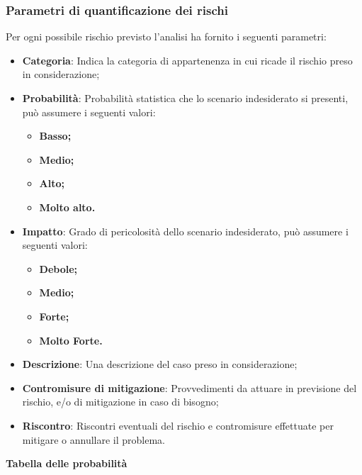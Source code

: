 \documentclass{scalatekids-article}
\begin{document}
\subsubsection{Parametri di quantificazione dei rischi}
Per ogni possibile rischio previsto l'analisi ha fornito i seguenti parametri:
\begin{itemize}
\item\textbf{Categoria}: Indica la categoria di appartenenza in cui ricade il
  rischio preso in considerazione;
\item\textbf{Probabilità}: Probabilità statistica che lo scenario indesiderato
  si presenti, può assumere i seguenti valori:
  \begin{itemize}
  \item\textbf{Basso;}
  \item\textbf{Medio;}
  \item\textbf{Alto;}
  \item\textbf{Molto alto.}
  \end{itemize}
\item\textbf{Impatto}: Grado di pericolosità dello scenario indesiderato, può
  assumere i seguenti valori:
  \begin{itemize}
  \item\textbf{Debole;}
  \item\textbf{Medio;}
  \item\textbf{Forte;}
  \item\textbf{Molto Forte.}
  \end{itemize}
\item\textbf{Descrizione}: Una descrizione del caso preso in considerazione;
\item\textbf{Contromisure di mitigazione}: Provvedimenti da attuare in
  previsione del rischio, e/o di mitigazione in caso di bisogno;
\item\textbf{Riscontro}: Riscontri eventuali del rischio e contromisure effettuate per mitigare o annullare il problema.
\end{itemize}
\textbf{Tabella delle probabilità}
\end{document}
